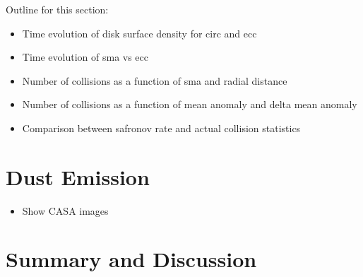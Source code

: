 \documentclass[twocolumn]{aastex63}
\begin{document}
Outline for this section:
\begin{itemize}
\item Time evolution of disk surface density for circ and ecc
\item Time evolution of sma vs ecc
\item Number of collisions as a function of sma and radial distance
\item Number of collisions as a function of mean anomaly and delta mean anomaly
\item Comparison between safronov rate and actual collision statistics
\end{itemize}

\section{Dust Emission} \label{sec:dust}

\begin{itemize}
\item Show CASA images
\end{itemize}

\section{Summary and Discussion} \label{sec:discuss}


\end{document}

